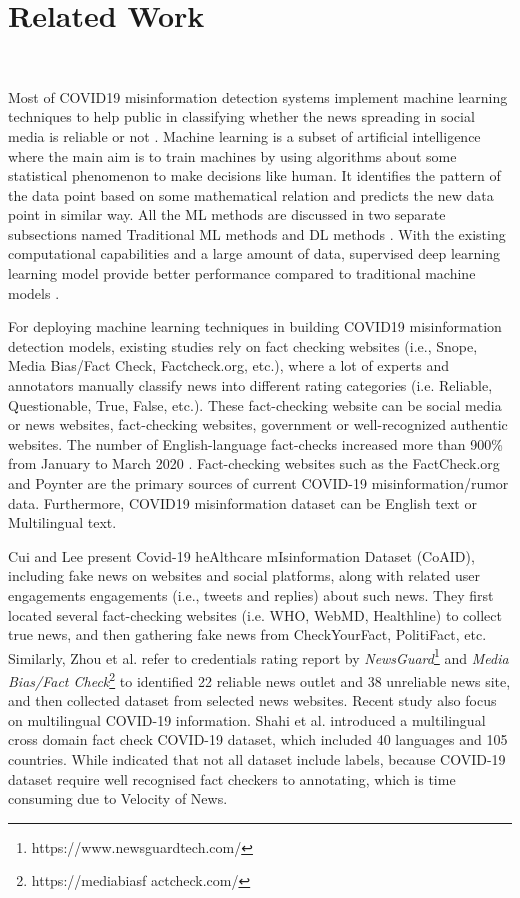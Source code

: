 \section{Related Work}~\label{sec:literature}

\noindent Most of COVID19 misinformation detection systems implement machine learning techniques to help public in classifying whether the news spreading in social media is reliable or not \cite{elhadad_detecting_2020}. Machine learning is a subset of artificial intelligence where the main aim is to train machines by using algorithms about some statistical phenomenon to make decisions like human. It identifies the pattern of the data point based on some mathematical relation and predicts the new data point in similar way. All the ML methods are discussed in two separate subsections named Traditional ML methods and DL methods \cite{ullah_survey_2021}. With the existing computational capabilities and a large amount of data, supervised deep learning learning model provide better performance compared to traditional machine models \cite{ayoub_combat_2021}. 

For deploying machine learning techniques in building COVID19 misinformation detection models, existing studies rely on fact checking websites (i.e., Snope, Media Bias/Fact Check, Factcheck.org, etc.), where a lot of experts and annotators manually classify news into different rating categories (i.e. Reliable, Questionable, True, False, etc.). 
These fact-checking website can be social media or news websites, fact-checking websites, government or well-recognized authentic websites. The number of English-language fact-checks increased more than 900\% from January to March 2020 \cite{noauthor_types_nodate}.  Fact-checking websites such as the FactCheck.org and Poynter are the primary sources of current COVID-19 misinformation/rumor data.
Furthermore, COVID19 misinformation dataset can be English text or Multilingual text. 

Cui and Lee \cite{cui_coaid_2020} present Covid-19 heAlthcare mIsinformation Dataset (CoAID), including fake news on websites and social platforms, along with related user engagements engagements (i.e., tweets and replies) about such news. They first located several fact-checking websites (i.e. WHO, WebMD, Healthline) to collect true news, and then gathering fake news from CheckYourFact, PolitiFact, etc. Similarly, Zhou et al.\cite{zhou_recovery_2020} refer to credentials rating report by \emph{NewsGuard}\footnote{https://www.newsguardtech.com/} and \emph{Media Bias/Fact Check}\footnote{https://mediabiasf actcheck.com/} to identified 22 reliable news outlet and 38 unreliable news site, and then collected dataset from selected news websites. 
Recent study also focus on multilingual COVID-19 information. 
Shahi et al. \cite{shahi_fakecovid_2020} introduced a multilingual cross domain fact check COVID-19 dataset, which included 40 languages and 105 countries. While \cite{abdul-mageed_mega-cov_2021} indicated that not all dataset include labels, because COVID-19 dataset require well recognised fact checkers to annotating, which is time consuming due to Velocity of News.  


